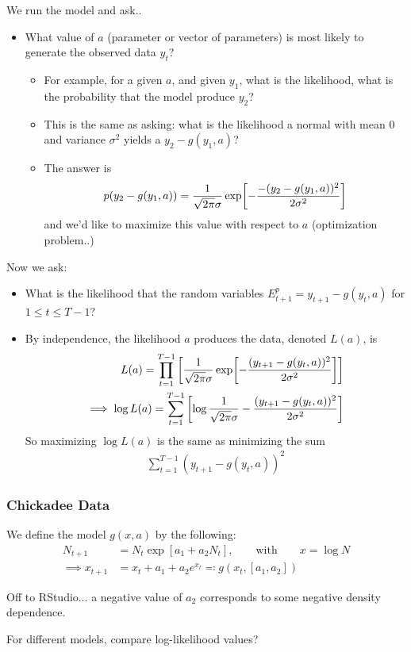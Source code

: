 \documentclass{article}
\begin{document}
            We run the model and ask..
            \begin{itemize}
                \item What value of $a$ (parameter or vector of parameters) is most likely to generate the observed data $y_t$?
                \begin{itemize}
                    \item For example, for a given $a$, and given $y_1$, what is the likelihood, what is the probability that the model produce $y_2$?
                    \item This is the same as asking: what is the likelihood a normal with mean $0$ and variance $\sigma^2$ yields a $y_2 - g(y_1,a)$?
                    \item The answer is
                    \begin{align}
                        p\qty(y_2 - g(y_1,a)) = \frac{1}{\sqrt{2\pi}\sigma}\exp[-\frac{-(y_2 - g(y_1,a))^2}{2\sigma^2}]
                    \end{align}
                    and we'd like to maximize this value with respect to $a$ (optimization problem..)
                \end{itemize}
            \end{itemize} 
            Now we ask:
            \begin{itemize}
                \item What is the likelihood that the random variables $E_{t+1}^p = y_{t+1} - g(y_t,a)$ for $1 \leq t \leq T-1$?
                \item By independence, the likelihood $a$ produces the data, denoted $L(a)$, is
                \begin{align}
                    L(a) = \prod_{t=1}^{T-1}\qty[\frac{1}{\sqrt{2\pi}\sigma}\exp[-\frac{(y_{t+1} - g(y_t,a))^2}{2\sigma^2}]] \\
                    \implies \log L(a) = \sum_{t=1}^{T-1} \qty[\log\frac{1}{\sqrt{2\pi}\sigma} - \frac{(y_{t+1} - g(y_t,a))^2}{2\sigma^2}]
                \end{align}
                So maximizing $\log L(a)$ is the same as minimizing the sum
                \begin{align}
                    \sum_{t=1}^{T-1}(y_{t+1} - g(y_t,a))^2
                \end{align}
            \end{itemize}

            \subsubsection{Chickadee Data}
                We define the model $g(x, a)$ by the following:
                \begin{align}
                    N_{t+1} &= N_t \exp[a_1 + a_2 N_t], \qquad \text{with} \qquad x = \log N \\
                    \implies x_{t+1} &= x_t + a_1 + a_2 e^{x_t} \eqqcolon g(x_t, [a_1,a_2])
                \end{align}

                Off to RStudio... a negative value of $a_2$ corresponds to some negative density dependence.

                For different models, compare log-likelihood values?
\end{document}
